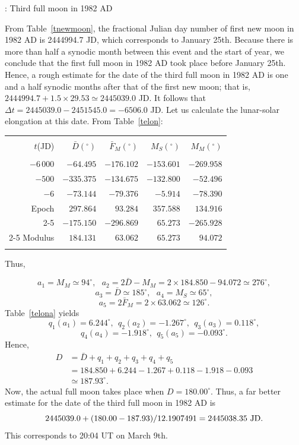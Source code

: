 \begin{center}
: Third full moon in 1982 AD
\end{center}
From Table~\ref{tnewmoon}, the fractional Julian day number of first new moon in 1982 AD is 2444994.7 JD, which
corresponds to January 25th. Because there is more than half a synodic month between this event and the
start of year, we conclude that the first full moon in 1982 AD took place before January 25th.  Hence, a rough estimate for the
date of the third full moon in 1982 AD is one and a half synodic months after that of the first new moon; that is, $2444994.7
+ 1.5\times 29.53\simeq 2445039.0$ JD. It follows that $\Delta t = 2445039.0 -2451545.0=-6506.0$ JD. Let us calculate the lunar-solar elongation at
this date.
From Table~\ref{telon}:
\begin{center}
\begin{tabular}{rrrrr}
&&&&\\
$t$(JD) & $ \bar{D}(^\circ)$ & $\bar{F}_M(^\circ)$ & $M_S(^\circ)$ & $M_M(^\circ)$\\[-2ex]
&&&&\\
$-6\,000$ & $-64.495$ & $-176.102$ & $-153.601$ & $-269.958$\\
$-500$ & $-335.375$ & $-134.675$ & $-132.800$ & $-52.496$\\
$-6$ & $-73.144$ & $-79.376$ & $-5.914$ & $-78.390$\\
Epoch & $297.864$ & $93.284$ & $357.588$ & $134.916$\\\cline{2-5}
&$-175.150$ & $-296.869$ & $65.273$ & $-265.928$\\\cline{2-5}
Modulus & $184.131$ & $63.062$ &$65.273$ & $94.072$\\ 
&&&\\
\end{tabular}
\end{center}
Thus,

$$
a_1=M_M\simeq 94^\circ,~~~a_2=2\bar{D}-M_M = 2\times 184.850-94.072\simeq 276^\circ,
$$ 
$$
a_3=\bar{D}\simeq 185^\circ,~~~a_4 = M_S\simeq 65^\circ,
$$ 
$$
a_5=2\bar{F}_M = 2\times 63.062\simeq 126^\circ.
$$
Table~\ref{telona} yields $$
q_1(a_1)=6.244^\circ,~~q_2(a_2)= -1.267^\circ,~~q_3(a_3) = 0.118^\circ,
$$
$$q_4(a_4)=-1.918^\circ,~~q_5(a_5)= -0.093^\circ.
$$
 Hence,
 \begin{align*}
D &= \bar{D} + q_1+q_2+q_3+q_4+q_5\\[0.5ex]
&=184.850+6.244-1.267+0.118-1.918-0.093\\[0.5ex]
&\simeq 187.93^\circ.
\end{align*}
Now, the actual full moon  takes place when $D=180.00^\circ$. Thus, a far better estimate for the date 
of the third full moon in 1982 AD is $$2445039.0 +(180.00-187.93)/12.1907491= 2445038.35\,\,{\rm JD}.$$
This corresponds to 20:04  UT on March 9th.

